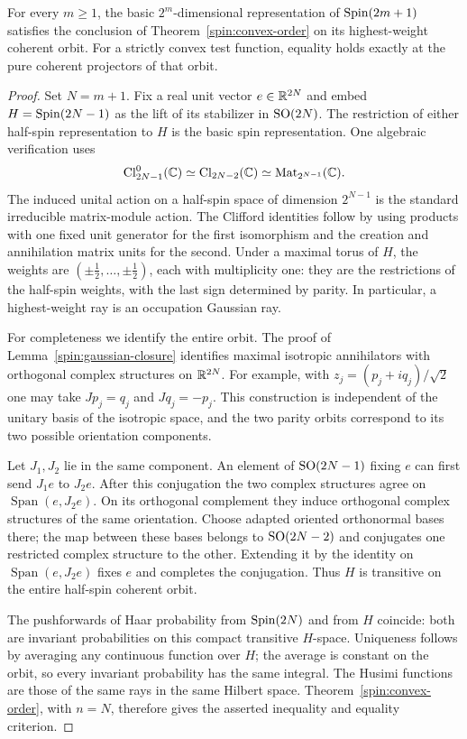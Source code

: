 \begin{corollary}
\label{spin:odd}
For every $m\ge1$, the basic $2^m$-dimensional representation of
$\operatorname{Spin}(2m+1)$ satisfies the conclusion of
Theorem~\ref{spin:convex-order} on its highest-weight coherent orbit.
For a strictly convex test function, equality holds exactly at the
pure coherent projectors of that orbit.
\end{corollary}
\begin{proof}
Set $N=m+1$.  Fix a real unit vector $e\in\mathbb R^{2N}$ and embed
$H=\operatorname{Spin}(2N-1)$ as the lift of its stabilizer in $\operatorname{SO}(2N)$.
The restriction of either half-spin representation to $H$ is the
basic spin representation.  One algebraic verification uses
\[
 \operatorname{Cl}_{2N-1}^0(\mathbb C)
 \simeq\operatorname{Cl}_{2N-2}(\mathbb C)
 \simeq\operatorname{Mat}_{2^{N-1}}(\mathbb C).
\]
The induced unital action on a half-spin space of dimension
$2^{N-1}$ is the standard irreducible matrix-module action.
The Clifford identities follow by using products with one fixed
unit generator for the first isomorphism and the creation and
annihilation matrix units for the second.  Under a maximal torus
of $H$, the weights are
$(\pm\tfrac12,\ldots,\pm\tfrac12)$, each with multiplicity one:
they are the restrictions of the half-spin weights, with the last
sign determined by parity.  In particular, a highest-weight ray
is an occupation Gaussian ray.

For completeness we identify the entire orbit.  The proof of
Lemma~\ref{spin:gaussian-closure} identifies maximal isotropic
annihilators with orthogonal complex structures on $\mathbb R^{2N}$.
For example, with $z_j=(p_j+iq_j)/\sqrt2$ one may take
$Jp_j=q_j$ and $Jq_j=-p_j$.  This construction is independent
of the unitary basis of the isotropic space, and the two parity
orbits correspond to its two possible orientation components.

Let $J_1,J_2$ lie in the same component.  An element of
$\operatorname{SO}(2N-1)$ fixing $e$ can first send $J_1e$ to $J_2e$.
After this conjugation the two complex structures agree on
$\operatorname{Span}(e,J_2e)$.  On its orthogonal complement
they induce orthogonal complex structures of the same orientation.
Choose adapted oriented orthonormal bases there; the map between
these bases belongs to $\operatorname{SO}(2N-2)$ and conjugates one restricted
complex structure to the other.  Extending it by the identity on
$\operatorname{Span}(e,J_2e)$ fixes $e$ and completes the conjugation.
Thus $H$ is transitive on the entire half-spin coherent orbit.

The pushforwards of Haar probability from $\operatorname{Spin}(2N)$ and from
$H$ coincide: both are invariant probabilities on this compact
transitive $H$-space.  Uniqueness follows by averaging any
continuous function over $H$; the average is constant on the
orbit, so every invariant probability has the same integral.
The Husimi functions are those of the same rays in the same
Hilbert space.  Theorem~\ref{spin:convex-order}, with $n=N$,
therefore gives the asserted inequality and equality criterion.
\end{proof}
